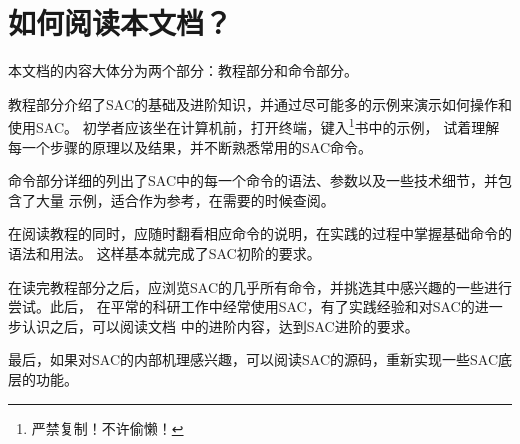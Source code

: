 \section{如何阅读本文档？}
本文档的内容大体分为两个部分：教程部分和命令部分。

教程部分介绍了SAC的基础及进阶知识，并通过尽可能多的示例来演示如何操作和使用SAC。
初学者应该坐在计算机前，打开终端，键入\footnote{严禁复制！不许偷懒！}书中的示例，
试着理解每一个步骤的原理以及结果，并不断熟悉常用的SAC命令。

命令部分详细的列出了SAC中的每一个命令的语法、参数以及一些技术细节，并包含了大量
示例，适合作为参考，在需要的时候查阅。

在阅读教程的同时，应随时翻看相应命令的说明，在实践的过程中掌握基础命令的语法和用法。
这样基本就完成了SAC初阶的要求。

在读完教程部分之后，应浏览SAC的几乎所有命令，并挑选其中感兴趣的一些进行尝试。此后，
在平常的科研工作中经常使用SAC，有了实践经验和对SAC的进一步认识之后，可以阅读文档
中的进阶内容，达到SAC进阶的要求。

最后，如果对SAC的内部机理感兴趣，可以阅读SAC的源码，重新实现一些SAC底层的功能。

